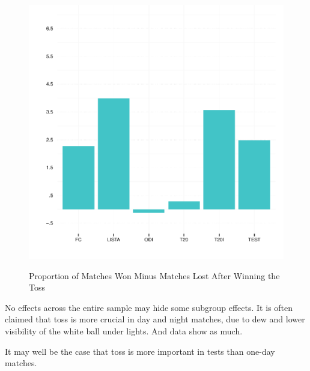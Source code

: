 \documentclass[11pt]{article}
\begin{document}
\begin{figure}[htbp]
\centering
\caption{Proportion of Matches Won Minus Matches Lost After Winning the Toss}
\includegraphics[scale=.75]{../figs/winbyType.pdf}
\label{fig:summary}
\end{figure}

No effects across the entire sample may hide some subgroup effects. It is often claimed that toss is more crucial in day and night matches, due to dew and lower visibility of the white ball under lights. And data show as much.

It may well be the case that toss is more important in tests than one-day matches.
\end{document}
